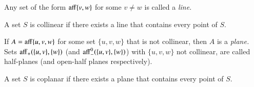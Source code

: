 \begin{tarskidata}
\begin{tarski}

\begin{definition}[line]
Any set of the form ${\operatorname{aff}}\{v,w\}$ for some $v\ne w$ is called a 
 {\it line.}
\end{definition}
\end{tarski}

\begin{tarski}

\begin{definition}[collinear]  
A set $S$ is collinear if there exists
a line that contains every point of $S$.
\end{definition}
\end{tarski}

\begin{tarski}

\begin{definition}
If $A={\operatorname{aff}}\{u,v,w\}$ for some set $\{u,v,w\}$ that is not collinear,
then $A$ is a {\it plane.}  Sets ${\operatorname{aff}}_+(\{u,v\},\{w\})$ (and ${\operatorname{aff}}_-^0(\{u,v\},\{w\})$) with
$\{u,v,w\}$ not collinear, are called half-planes (and open-half planes respectively).  
\end{definition}
\end{tarski}

\begin{tarski}

\begin{definition}[coplanar]
A set $S$ is  coplanar if there exists
a plane that contains every point of $S$.
\end{definition}
\end{tarski}

\begin{tarski}


\end{tarski}
\end{tarskidata}
